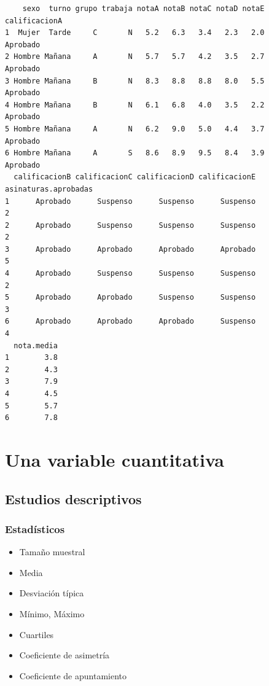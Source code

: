 \documentclass[
  a4paper,
]{scrreport}
\providecommand{\tightlist}{%
  \setlength{\itemsep}{0pt}\setlength{\parskip}{0pt}}\usepackage{longtable,booktabs,array}
\theoremstyle{definition}
\theoremstyle{definition}
\theoremstyle{remark}
\begin{document}
\begin{verbatim}
    sexo  turno grupo trabaja notaA notaB notaC notaD notaE calificacionA
1  Mujer  Tarde     C       N   5.2   6.3   3.4   2.3   2.0      Aprobado
2 Hombre Mañana     A       N   5.7   5.7   4.2   3.5   2.7      Aprobado
3 Hombre Mañana     B       N   8.3   8.8   8.8   8.0   5.5      Aprobado
4 Hombre Mañana     B       N   6.1   6.8   4.0   3.5   2.2      Aprobado
5 Hombre Mañana     A       N   6.2   9.0   5.0   4.4   3.7      Aprobado
6 Hombre Mañana     A       S   8.6   8.9   9.5   8.4   3.9      Aprobado
  calificacionB calificacionC calificacionD calificacionE asinaturas.aprobadas
1      Aprobado      Suspenso      Suspenso      Suspenso                    2
2      Aprobado      Suspenso      Suspenso      Suspenso                    2
3      Aprobado      Aprobado      Aprobado      Aprobado                    5
4      Aprobado      Suspenso      Suspenso      Suspenso                    2
5      Aprobado      Aprobado      Suspenso      Suspenso                    3
6      Aprobado      Aprobado      Aprobado      Suspenso                    4
  nota.media
1        3.8
2        4.3
3        7.9
4        4.5
5        5.7
6        7.8
\end{verbatim}

\section{Una variable cuantitativa}\label{una-variable-cuantitativa}

\subsection{Estudios descriptivos}\label{estudios-descriptivos}

\subsubsection{Estadísticos}\label{estaduxedsticos}

\begin{itemize}
\tightlist
\item
  Tamaño muestral
\item
  Media
\item
  Desviación típica
\item
  Mínimo, Máximo
\item
  Cuartiles
\item
  Coeficiente de asimetría
\item
  Coeficiente de apuntamiento
\end{itemize}
\end{document}
